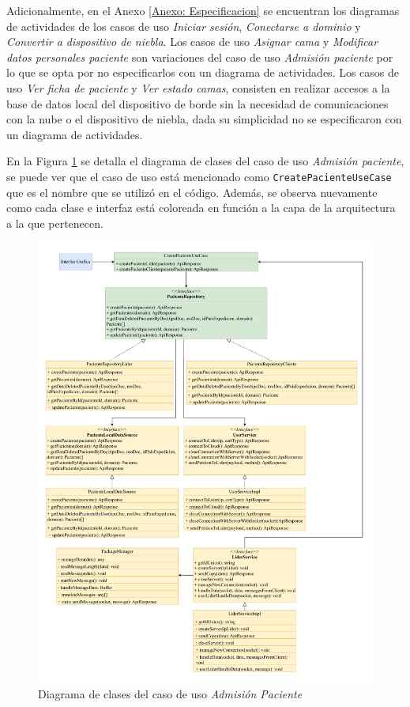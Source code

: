 Adicionalmente, en el Anexo \ref{Anexo: Especificacion} se encuentran los diagramas de actividades de los casos de uso \textit{Iniciar sesión}, \textit{Conectarse a dominio} y \textit{Convertir a dispositivo de niebla}. Los casos de uso \textit{Asignar cama} y \textit{Modificar datos personales paciente} son variaciones del caso de uso \textit{Admisión paciente} por lo que se opta por no especificarlos con un diagrama de actividades. Los casos de uso \textit{Ver ficha de paciente} y \textit{Ver estado camas}, consisten en realizar accesos a la base de datos local del dispositivo de borde sin la necesidad de comunicaciones con la nube o el dispositivo de niebla, dada su simplicidad no se especificaron con un diagrama de actividades.

En la Figura \ref{fig:diagClasesAdmPaciente} se detalla el diagrama de clases del caso de uso \textit{Admisión paciente}, se puede ver que el caso de uso está mencionado como \texttt{CreatePacienteUseCase} que es el nombre que se utilizó en el código. Además, se observa nuevamente como cada clase e interfaz está coloreada en función a la capa de la arquitectura a la que pertenecen.

\begin{figure}
    \centering
    \includegraphics[width=\textwidth, height=\textheight, keepaspectratio]{Imagenes/Implementacion/DiagramaClasesAdmPaciente.pdf}
    \caption{Diagrama de clases del caso de uso \textit{Admisión Paciente}}
    \label{fig:diagClasesAdmPaciente}
\end{figure}


